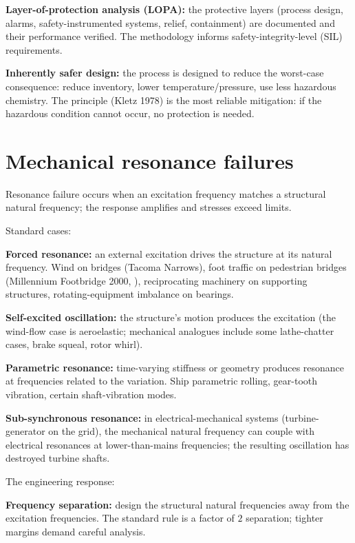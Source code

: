 \textbf{Layer-of-protection analysis (LOPA):} the protective layers (process design, alarms, safety-instrumented systems, relief, containment) are documented and their performance verified. The methodology informs safety-integrity-level (SIL) requirements.

\textbf{Inherently safer design:} the process is designed to reduce the worst-case consequence: reduce inventory, lower temperature/pressure, use less hazardous chemistry. The principle (Kletz 1978) is the most reliable mitigation: if the hazardous condition cannot occur, no protection is needed.

\section{Mechanical resonance failures}

Resonance failure occurs when an excitation frequency matches a structural natural frequency; the response amplifies and stresses exceed limits.

Standard cases:

\textbf{Forced resonance:} an external excitation drives the structure at its natural frequency. Wind on bridges (Tacoma Narrows), foot traffic on pedestrian bridges (Millennium Footbridge 2000, \cite{acc:dallard-millennium-2001}), reciprocating machinery on supporting structures, rotating-equipment imbalance on bearings.

\textbf{Self-excited oscillation:} the structure's motion produces the excitation (the wind-flow case is aeroelastic; mechanical analogues include some lathe-chatter cases, brake squeal, rotor whirl).

\textbf{Parametric resonance:} time-varying stiffness or geometry produces resonance at frequencies related to the variation. Ship parametric rolling, gear-tooth vibration, certain shaft-vibration modes.

\textbf{Sub-synchronous resonance:} in electrical-mechanical systems (turbine-generator on the grid), the mechanical natural frequency can couple with electrical resonances at lower-than-mains frequencies; the resulting oscillation has destroyed turbine shafts.

The engineering response:

\textbf{Frequency separation:} design the structural natural frequencies away from the excitation frequencies. The standard rule is a factor of $2$ separation; tighter margins demand careful analysis.

